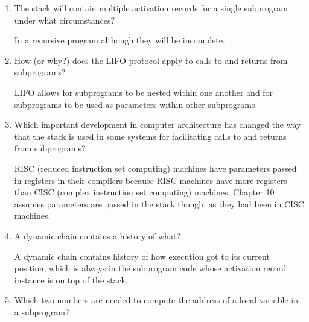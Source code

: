 \begin{enumerate}
\begin{enumerate}
\begin{answer}
    \end{answer}
    \end{enumerate}

  \item The stack will contain multiple activation
    records for a single subprogram under what
    circumstances?

\begin{answer}

    In a recursive program although they will be incomplete.

    \end{answer}

  \item How (or why?) does the LIFO protocol apply to
    calls to and returns from subprograms?

\begin{answer}

    LIFO allows for subprograms to be nested within one another and for subprograms
to be used as parameters within other subprograms.

    \end{answer}

  \item Which important development in computer architecture
    has changed the way that the stack is used in some
    systems for facilitating calls to and returns from
    subprograms?

 \begin{answer}

    RISC (reduced instruction set computing) machines have parameters passed in
 registers in their compilers because RISC machines have more registers than CISC
 (complex instruction set computing) machines. Chapter 10 assumes parameters are
 passed in the stack though, as they had been in CISC machines.

    \end{answer}

  \item A dynamic chain contains a history of what?

 \begin{answer}

    A dynamic chain contains history of how execution got to its current position,
which is always in the subprogram code whose activation record instance is on top
of the stack.

    \end{answer}

  \item Which two numbers are needed to compute
    the address of a local variable in a subprogram?


\end{enumerate}

